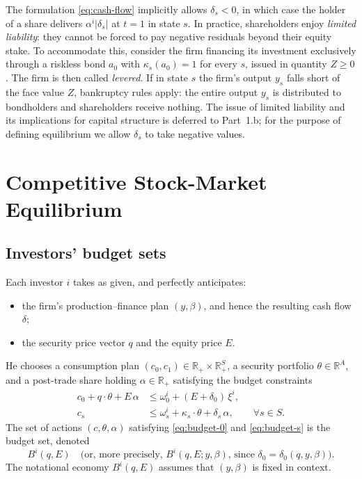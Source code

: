 \documentclass[11pt,a4paper]{article}
\def\R{\mathbb{R}}
\def\leq{\leqslant}
\def\geq{\geqslant}
\theoremstyle{plain}
\theoremstyle{definition}
\theoremstyle{remark}
\begin{document}
The formulation \eqref{eq:cash-flow} implicitly allows $\delta_s<0$, in which case the holder of a share delivers $\alpha^i |\delta_s|$ at $t=1$ in state $s$. In practice, shareholders enjoy \emph{limited liability}: they cannot be forced to pay negative residuals beyond their equity stake. To accommodate this, consider the firm financing its investment exclusively through a riskless bond $a_0$ with $\kappa_s(a_0)=1$ for every $s$, issued in quantity $Z\geq 0$. The firm is then called \emph{levered}. If in state $s$ the firm's output $y_s$ falls short of the face value $Z$, bankruptcy rules apply: the entire output $y_s$ is distributed to bondholders and shareholders receive nothing. The issue of limited liability and its implications for capital structure is deferred to Part~1.b; for the purpose of defining equilibrium we allow $\delta_s$ to take negative values.

\section{Competitive Stock-Market Equilibrium}

\subsection{Investors' budget sets}

Each investor $i$ takes as given, and perfectly anticipates:
\begin{itemize}
  \item the firm's production--finance plan $(y,\beta)$, and hence the resulting cash flow $\delta$;
  \item the security price vector $q$ and the equity price $E$.
\end{itemize}
He chooses a consumption plan $(c_0,c_1)\in\R_+\times\R_+^S$, a security portfolio $\theta\in\R^A$, and a post-trade share holding $\alpha\in\R_+$ satisfying the budget constraints
\begin{align}
  c_0 + q\cdot\theta + E\,\alpha &\leq \omega^i_0 + (E+\delta_0)\,\xi^i,
  \label{eq:budget-0}\\[2pt]
  c_s &\leq \omega^i_s + \kappa_s\cdot\theta + \delta_s\,\alpha,
  \qquad \forall s\in S.
  \label{eq:budget-s}
\end{align}
The set of actions $(c,\theta,\alpha)$ satisfying \eqref{eq:budget-0} and \eqref{eq:budget-s} is the budget set, denoted
\[
  B^i(q,E) \quad \text{(or, more precisely, } B^i(q,E;y,\beta)\text{, since } \delta_0 = \delta_0(q,y,\beta)\text{).}
\]
The notational economy $B^i(q,E)$ assumes that $(y,\beta)$ is fixed in context.
\end{document}
